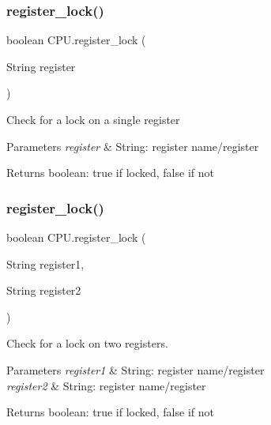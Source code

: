 \subsubsection{\texorpdfstring{register\+\_\+lock()}{register\_lock()}\hspace{0.1cm}{\footnotesize\ttfamily [1/2]}}
{\footnotesize\ttfamily boolean C\+P\+U.\+register\+\_\+lock (\begin{DoxyParamCaption}\item[{String}]{register }\end{DoxyParamCaption})\hspace{0.3cm}{\ttfamily [private]}}

Check for a lock on a single register


\begin{DoxyParams}{Parameters}
{\em register} & String\+: register name/register \\
\hline
\end{DoxyParams}
\begin{DoxyReturn}{Returns}
boolean\+: true if locked, false if not 
\end{DoxyReturn}
\mbox{\label{class_c_p_u_a80a32deceb58fe8d9d146c5486ce7f0b}} 
\subsubsection{\texorpdfstring{register\+\_\+lock()}{register\_lock()}\hspace{0.1cm}{\footnotesize\ttfamily [2/2]}}
{\footnotesize\ttfamily boolean C\+P\+U.\+register\+\_\+lock (\begin{DoxyParamCaption}\item[{String}]{register1,  }\item[{String}]{register2 }\end{DoxyParamCaption})\hspace{0.3cm}{\ttfamily [private]}}

Check for a lock on two registers.


\begin{DoxyParams}{Parameters}
{\em register1} & String\+: register name/register \\
\hline
{\em register2} & String\+: register name/register \\
\hline
\end{DoxyParams}
\begin{DoxyReturn}{Returns}
boolean\+: true if locked, false if not 
\end{DoxyReturn}
\mbox{\label{class_c_p_u_ad9caa09946940961ed789371a41ad683}} 
